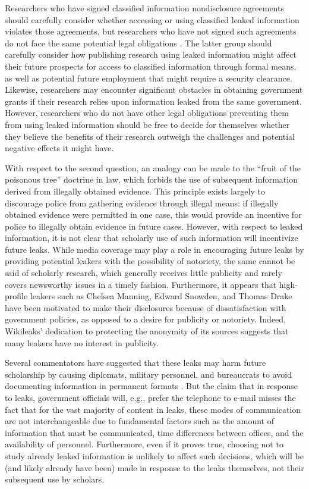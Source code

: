 \documentclass[12pt]{article}
\begin{document}
Researchers who have signed classified information nondisclosure 
agreements should 
carefully consider whether accessing or using classified leaked information violates those agreements, 
but researchers who have not signed such agreements do not face the same potential legal 
obligations \citep{cox2011wikileaks}. The latter group should carefully consider 
how publishing research using leaked information might affect their future prospects for access to 
classified information through formal means, as well as potential future employment that might require 
a security clearance.
Likewise, researchers may encounter significant obstacles in obtaining government grants if their research 
relies upon information leaked from the same government. 
However, researchers who do not 
have other legal obligations preventing them from using leaked information should be free to decide for themselves 
whether they believe the benefits of their research outweigh the challenges and potential negative effects it might have.

With respect to the second question, an analogy can be made to the ``fruit of the poisonous tree'' 
doctrine in law, which forbids the use of subsequent information derived from illegally obtained 
evidence. This principle exists largely to discourage police from 
gathering evidence through illegal means: if illegally obtained evidence were permitted in one 
case, this would provide an incentive for police to illegally obtain evidence in future cases. 
However, with respect to leaked information, it is not clear 
that scholarly use of such information will incentivize future leaks.
While media coverage may play a role in encouraging future leaks by providing 
potential leakers with the possibility of notoriety, the same cannot be said of scholarly research, 
which generally receives little publicity and rarely covers newsworthy issues in a timely fashion.
Furthermore, it appears that high-profile leakers such as Chelsea Manning, Edward Snowden, and 
Thomas Drake have 
been motivated to make their disclosures because of dissatisfaction with government policies, as 
opposed to a desire for publicity or notoriety. Indeed, Wikileaks' dedication to protecting the anonymity of 
its sources suggests that many leakers have no interest in publicity.

Several commentators have suggested that these leaks may harm future scholarship by causing 
diplomats, military personnel, and bureaucrats to avoid documenting information in permanent 
formats \citep{drezner2010why,simmons2011international}. 
But the claim that in response to leaks, government 
officials will, e.g., prefer the telephone to e-mail misses the fact that for the vast majority of 
content in leaks, these modes of communication are not interchangeable due to fundamental factors such as the 
amount of information that must be communicated, time differences between offices, and the availability of 
personnel. Furthermore, even if it proves true, choosing not to study already leaked 
information is unlikely to affect 
such decisions, which will be (and likely already have been) made in response to 
the leaks themselves, not their subsequent use by scholars.
\end{document}
